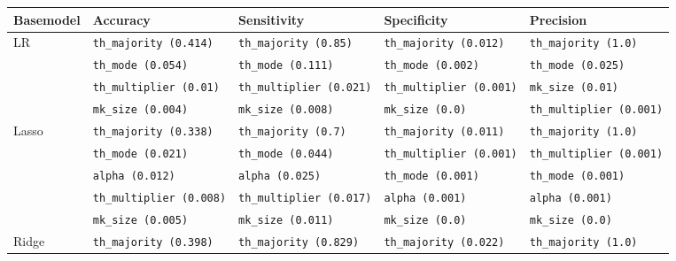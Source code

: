 \begin{table}[ht]
    \footnotesize
    \begin{adjustwidth}{-3.5cm}{}
        \begin{tabular}{lllll}
        Basemodel & Accuracy                              & Sensitivity                           & Specificity                         & Precision                             \\ \hline
        LR        & \texttt{th\_majority (0.414)}         & \texttt{th\_majority (0.85)}          & \texttt{th\_majority (0.012)}       & \texttt{th\_majority (1.0)}           \\
                  & \texttt{th\_mode (0.054)}             & \texttt{th\_mode (0.111)}             & \texttt{th\_mode (0.002)}           & \texttt{th\_mode (0.025)}             \\
                  & \texttt{th\_multiplier (0.01)}        & \texttt{th\_multiplier (0.021)}       & \texttt{th\_multiplier (0.001)}     & \texttt{mk\_size (0.01)}              \\
                  & \texttt{mk\_size (0.004)}             & \texttt{mk\_size (0.008)}             & \texttt{mk\_size (0.0)}             & \texttt{th\_multiplier (0.001)}       \\
        Lasso     & \texttt{th\_majority (0.338)}         & \texttt{th\_majority (0.7)}           & \texttt{th\_majority (0.011)}       & \texttt{th\_majority (1.0)}           \\
                  & \texttt{th\_mode (0.021)}             & \texttt{th\_mode (0.044)}             & \texttt{th\_multiplier (0.001)}     & \texttt{th\_multiplier (0.001)}       \\
                  & \texttt{alpha (0.012)}                & \texttt{alpha (0.025)}                & \texttt{th\_mode (0.001)}           & \texttt{th\_mode (0.001)}             \\
                  & \texttt{th\_multiplier (0.008)}       & \texttt{th\_multiplier (0.017)}       & \texttt{alpha (0.001)}              & \texttt{alpha (0.001)}                \\
                  & \texttt{mk\_size (0.005)}             & \texttt{mk\_size (0.011)}             & \texttt{mk\_size (0.0)}             & \texttt{mk\_size (0.0)}               \\
        Ridge     & \texttt{th\_majority (0.398)}         & \texttt{th\_majority (0.829)}         & \texttt{th\_majority (0.022)}       & \texttt{th\_majority (1.0)}           \\

\end{tabular}
\end{adjustwidth}
\end{table}
